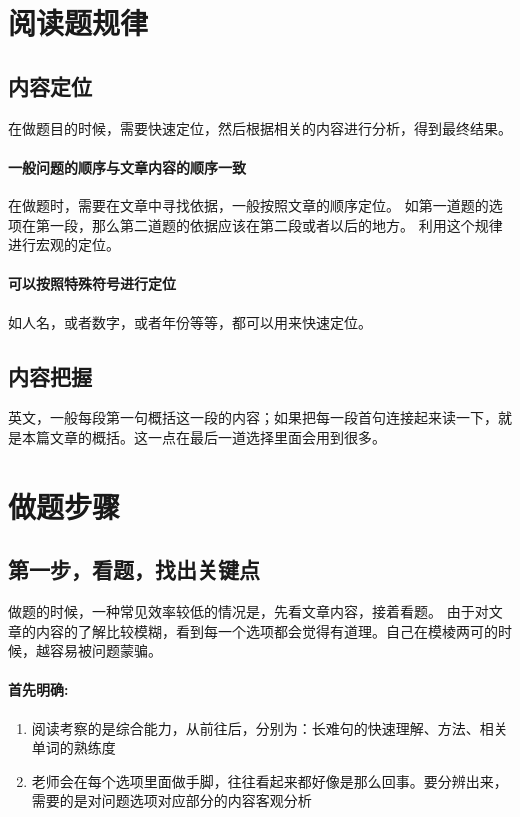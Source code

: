 \documentclass[a4paper]{ctexart}
\begin{document}
\section{阅读题规律}
\subsection{内容定位}
在做题目的时候，需要快速定位，然后根据相关的内容进行分析，得到最终结果。

\paragraph{一般问题的顺序与文章内容的顺序一致}
在做题时，需要在文章中寻找依据，一般按照文章的顺序定位。 如第一道题的选项在第一段，那么第二道题的依据应该在第二段或者以后的地方。 利用这个规律进行宏观的定位。

\paragraph{可以按照特殊符号进行定位}
如人名，或者数字，或者年份等等，都可以用来快速定位。

\subsection{内容把握}
英文，一般每段第一句概括这一段的内容；如果把每一段首句连接起来读一下，就是本篇文章的概括。这一点在最后一道选择里面会用到很多。

\section{做题步骤}

\subsection{第一步，看题，找出关键点}
做题的时候，一种常见效率较低的情况是，先看文章内容，接着看题。 由于对文章的内容的了解比较模糊，看到每一个选项都会觉得有道理。自己在模棱两可的时候，越容易被问题蒙骗。
\paragraph{首先明确:}
\begin {enumerate}
    \item 阅读考察的是综合能力，从前往后，分别为：长难句的快速理解、方法、相关单词的熟练度
    \item 老师会在每个选项里面做手脚，往往看起来都好像是那么回事。要分辨出来，需要的是对问题选项对应部分的内容客观分析
\end {enumerate}
\end{document}
